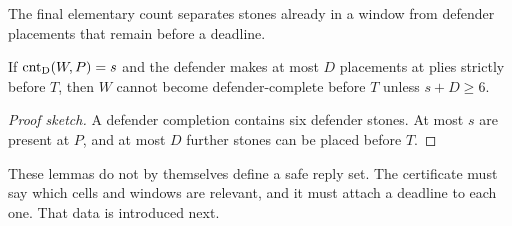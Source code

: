 The final elementary count separates stones already in a window from defender
placements that remain before a deadline.

\begin{lemma}
\label{lem:L7}
If $\operatorname{cnt}_{\mathrm{D}}(W,P)=s$ and the defender makes at most $D$ placements at plies
strictly before $T$, then $W$ cannot become defender-complete before $T$
unless $s+D\ge6$.
\end{lemma}

\begin{proof}[Proof sketch]
A defender completion contains six defender stones.  At most $s$ are present
at $P$, and at most $D$ further stones can be placed before $T$.
\end{proof}

These lemmas do not by themselves define a safe reply set.  The certificate
must say which cells and windows are relevant, and it must attach a deadline
to each one.  That data is introduced next.
